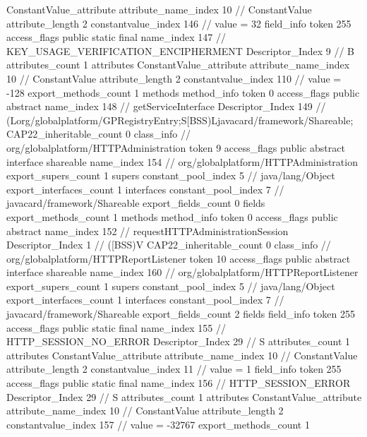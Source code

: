 {{{{{{				ConstantValue_attribute {
					attribute_name_index	10		// ConstantValue
					attribute_length	2
					constantvalue_index	146		// value = 32
				}
				}
			}
			field_info {
				token	255
				access_flags	public static final
				name_index	147		// KEY_USAGE_VERIFICATION_ENCIPHERMENT
				Descriptor_Index	9		// B
				attributes_count	1
				attributes {
				ConstantValue_attribute {
					attribute_name_index	10		// ConstantValue
					attribute_length	2
					constantvalue_index	110		// value = -128
				}
				}
			}
			}
			export_methods_count	1
			methods {
				method_info {
					token	0
					access_flags	public abstract
					name_index	148		// getServiceInterface
					Descriptor_Index	149		// (Lorg/globalplatform/GPRegistryEntry;S[BSS)Ljavacard/framework/Shareable;
				}
			}
			CAP22_inheritable_count	0
		}
		class_info {		// org/globalplatform/HTTPAdministration
			token	9
			access_flags	public abstract interface shareable
			name_index	154		// org/globalplatform/HTTPAdministration
			export_supers_count	1
			supers {
				constant_pool_index	5		// java/lang/Object
			}
			export_interfaces_count	1
			interfaces {
				constant_pool_index	7		// javacard/framework/Shareable
			}
			export_fields_count	0
			fields {
			}
			export_methods_count	1
			methods {
				method_info {
					token	0
					access_flags	public abstract
					name_index	152		// requestHTTPAdministrationSession
					Descriptor_Index	1		// ([BSS)V
				}
			}
			CAP22_inheritable_count	0
		}
		class_info {		// org/globalplatform/HTTPReportListener
			token	10
			access_flags	public abstract interface shareable
			name_index	160		// org/globalplatform/HTTPReportListener
			export_supers_count	1
			supers {
				constant_pool_index	5		// java/lang/Object
			}
			export_interfaces_count	1
			interfaces {
				constant_pool_index	7		// javacard/framework/Shareable
			}
			export_fields_count	2
			fields {
			field_info {
				token	255
				access_flags	public static final
				name_index	155		// HTTP_SESSION_NO_ERROR
				Descriptor_Index	29		// S
				attributes_count	1
				attributes {
				ConstantValue_attribute {
					attribute_name_index	10		// ConstantValue
					attribute_length	2
					constantvalue_index	11		// value = 1
				}
				}
			}
			field_info {
				token	255
				access_flags	public static final
				name_index	156		// HTTP_SESSION_ERROR
				Descriptor_Index	29		// S
				attributes_count	1
				attributes {
				ConstantValue_attribute {
					attribute_name_index	10		// ConstantValue
					attribute_length	2
					constantvalue_index	157		// value = -32767
				}
				}
			}
			}
			export_methods_count	1
}}}
